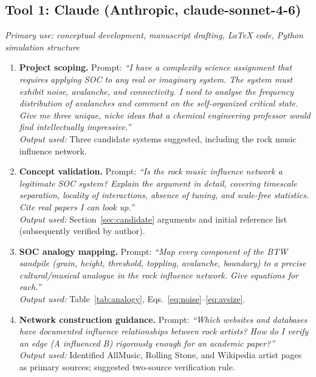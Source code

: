 \documentclass[12pt, a4paper]{article}
\begin{document}
\subsection*{Tool 1: Claude (Anthropic, claude-sonnet-4-6)}
\textit{Primary use: conceptual development, manuscript drafting,
LaTeX code, Python simulation structure}

\begin{enumerate}[label=\textbf{C\arabic*.}, leftmargin=*, itemsep=6pt]

  \item \textbf{Project scoping.}
  Prompt: \textit{``I have a complexity science assignment that
  requires applying SOC to any real or imaginary system.
  The system must exhibit noise, avalanche, and connectivity.
  I need to analyse the frequency distribution of avalanches and
  comment on the self-organized critical state.
  Give me three unique, niche ideas that a chemical engineering
  professor would find intellectually impressive.''}\\
  \textit{Output used:} Three candidate systems suggested,
  including the rock music influence network.

  \item \textbf{Concept validation.}
  Prompt: \textit{``Is the rock music influence network a
  legitimate SOC system? Explain the argument in detail,
  covering timescale separation, locality of interactions,
  absence of tuning, and scale-free statistics. Cite real
  papers I can look up.''}\\
  \textit{Output used:} Section~\ref{sec:candidate} arguments
  and initial reference list (subsequently verified by author).

  \item \textbf{SOC analogy mapping.}
  Prompt: \textit{``Map every component of the BTW sandpile
  (grain, height, threshold, toppling, avalanche, boundary)
  to a precise cultural/musical analogue in the rock influence
  network. Give equations for each.''}\\
  \textit{Output used:} Table~\ref{tab:analogy},
  Eqs.~\ref{eq:noise}--\ref{eq:avsize}.

  \item \textbf{Network construction guidance.}
  Prompt: \textit{``Which websites and databases have documented
  influence relationships between rock artists? How do I verify
  an edge (A influenced B) rigorously enough for an academic
  paper?''}\\
  \textit{Output used:} Identified AllMusic, Rolling Stone, and
  Wikipedia artist pages as primary sources; suggested
  two-source verification rule.


\end{enumerate}
\end{document}
